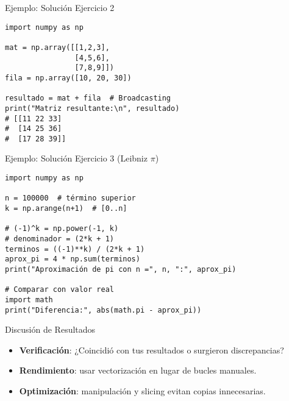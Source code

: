 \documentclass[10pt]{beamer}
\begin{document}
\begin{frame}[fragile]{Ejemplo: Solución Ejercicio 2}
\begin{verbatim}
import numpy as np

mat = np.array([[1,2,3],
                [4,5,6],
                [7,8,9]])
fila = np.array([10, 20, 30])

resultado = mat + fila  # Broadcasting
print("Matriz resultante:\n", resultado)
# [[11 22 33]
#  [14 25 36]
#  [17 28 39]]
\end{verbatim}
\end{frame}

\begin{frame}[fragile]{Ejemplo: Solución Ejercicio 3 (Leibniz \(\pi\))}
\begin{verbatim}
import numpy as np

n = 100000  # término superior
k = np.arange(n+1)  # [0..n]

# (-1)^k = np.power(-1, k)
# denominador = (2*k + 1)
terminos = ((-1)**k) / (2*k + 1)
aprox_pi = 4 * np.sum(terminos)
print("Aproximación de pi con n =", n, ":", aprox_pi)

# Comparar con valor real
import math
print("Diferencia:", abs(math.pi - aprox_pi))
\end{verbatim}
\end{frame}

\begin{frame}{Discusión de Resultados}
  \begin{itemize}
    \item \textbf{Verificación}: ¿Coincidió con tus resultados o surgieron discrepancias?
    \item \textbf{Rendimiento}: usar vectorización en lugar de bucles manuales.
    \item \textbf{Optimización}: manipulación y slicing evitan copias innecesarias.
  \end{itemize}
\end{frame}
\end{document}
